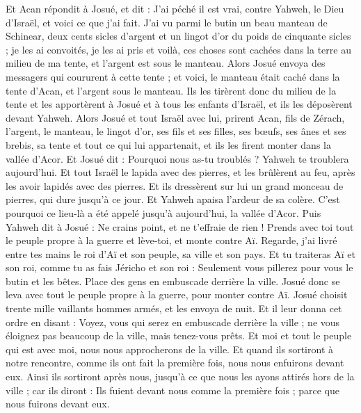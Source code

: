 \begin{multicols}{2}
Et Acan répondit à Josué, et dit : J'ai péché il est vrai, contre Yahweh, le Dieu d'Israël, et voici ce que j'ai fait.
J'ai vu parmi le butin un beau manteau de Schinear, deux cents sicles d'argent et un lingot d'or du poids de cinquante sicles ; je les ai convoités, je les ai pris et voilà, ces choses sont cachées dans la terre au milieu de ma tente, et l'argent est sous le manteau.
Alors Josué envoya des messagers qui coururent à cette tente ; et voici, le manteau était caché dans la tente d'Acan, et l'argent sous le manteau.
Ils les tirèrent donc du milieu de la tente et les apportèrent à Josué et à tous les enfants d'Israël, et ils les déposèrent devant Yahweh.
Alors Josué et tout Israël avec lui, prirent Acan, fils de Zérach, l'argent, le manteau, le lingot d'or, ses fils et ses filles, ses bœufs, ses ânes et ses brebis, sa tente et tout ce qui lui appartenait, et ils les firent monter dans la vallée d'Acor.
Et Josué dit : Pourquoi nous as-tu troublés ? Yahweh te troublera aujourd'hui. Et tout Israël le lapida avec des pierres, et les brûlèrent au feu, après les avoir lapidés avec des pierres.
Et ils dressèrent sur lui un grand monceau de pierres, qui dure jusqu'à ce jour. Et Yahweh apaisa l'ardeur de sa colère. C'est pourquoi ce lieu-là a été appelé jusqu'à aujourd'hui, la vallée d'Acor.
\VerseOne{}Puis Yahweh dit à Josué : Ne crains point, et ne t'effraie de rien ! Prends avec toi tout le peuple propre à la guerre et lève-toi, et monte contre Aï. Regarde, j'ai livré entre tes mains le roi d'Aï et son peuple, sa ville et son pays.
Et tu traiteras Aï et son roi, comme tu as fais Jéricho et son roi : Seulement vous pillerez pour vous le butin et les bêtes. Place des gens en embuscade derrière la ville.
Josué donc se leva avec tout le peuple propre à la guerre, pour monter contre Aï. Josué choisit trente mille vaillants hommes armés, et les envoya de nuit.
Et il leur donna cet ordre en disant : Voyez, vous qui serez en embuscade derrière la ville ; ne vous éloignez pas beaucoup de la ville, mais tenez-vous prêts.
Et moi et tout le peuple qui est avec moi, nous nous approcherons de la ville. Et quand ils sortiront à notre rencontre, comme ils ont fait la première fois, nous nous enfuirons devant eux.
Ainsi ils sortiront après nous, jusqu'à ce que nous les ayons attirés hors de la ville ; car ils diront : Ils fuient devant nous comme la première fois ; parce que nous fuirons devant eux.

\end{multicols}
